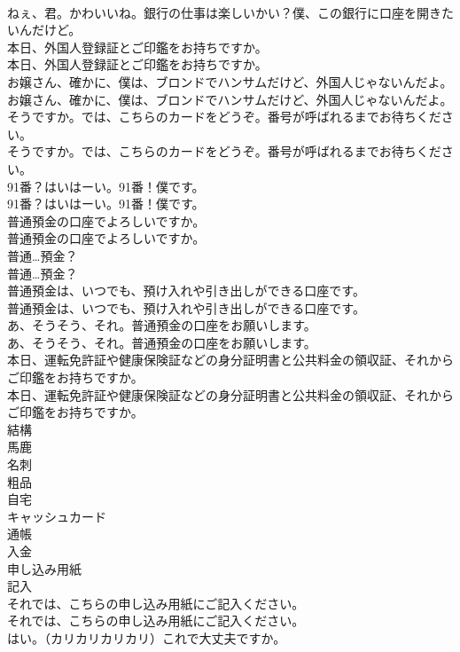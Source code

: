 \documentclass[8pt]{extreport}
\begin{document}
\begin{CJK}{UTF8}{min}
\\	ねぇ、君。かわいいね。銀行の仕事は楽しいかい？僕、この銀行に口座を開きたいんだけど。 
\\	本日、外国人登録証とご印鑑をお持ちですか。	
\\	本日、外国人登録証とご印鑑をお持ちですか。 
\\	お嬢さん、確かに、僕は、ブロンドでハンサムだけど、外国人じゃないんだよ。	
\\	お嬢さん、確かに、僕は、ブロンドでハンサムだけど、外国人じゃないんだよ。 
\\	そうですか。では、こちらのカードをどうぞ。番号が呼ばれるまでお待ちください。	
\\	そうですか。では、こちらのカードをどうぞ。番号が呼ばれるまでお待ちください。 
\\	91番？はいはーい。91番！僕です。	
\\	91番？はいはーい。91番！僕です。 
\\	普通預金の口座でよろしいですか。	
\\	普通預金の口座でよろしいですか。 
\\	普通…預金？	
\\	普通…預金？ 
\\	普通預金は、いつでも、預け入れや引き出しができる口座です。	
\\	普通預金は、いつでも、預け入れや引き出しができる口座です。 
\\	あ、そうそう、それ。普通預金の口座をお願いします。	
\\	あ、そうそう、それ。普通預金の口座をお願いします。 
\\	本日、運転免許証や健康保険証などの身分証明書と公共料金の領収証、それからご印鑑をお持ちですか。	
\\	本日、運転免許証や健康保険証などの身分証明書と公共料金の領収証、それからご印鑑をお持ちですか。 
\\	結構
\\	馬鹿
\\	名刺
\\	粗品
\\	自宅
\\	キャッシュカード
\\	通帳
\\	入金
\\	申し込み用紙
\\	記入
\\	それでは、こちらの申し込み用紙にご記入ください。	
\\	それでは、こちらの申し込み用紙にご記入ください。 
\\	はい。（カリカリカリカリ）これで大丈夫ですか。	

\end{CJK}
\end{document}
